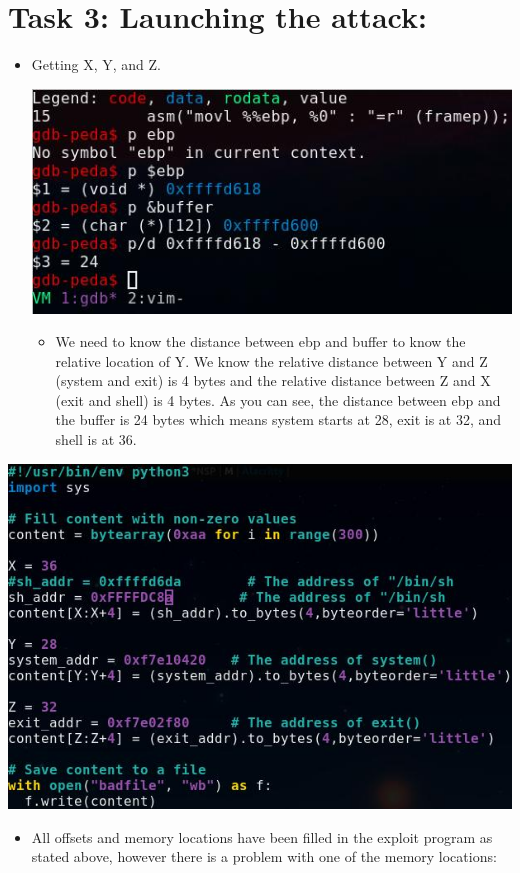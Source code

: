 \documentclass[11pt]{article}
\begin{document}
\section*{Task 3: Launching the attack:}
\label{sec:org2742746}
\begin{itemize}
\item Getting X, Y, and Z.
\begin{center}
\includegraphics[width=.9\linewidth]{./images/3.jpg}
\end{center}
\begin{itemize}
\item We need to know the distance between ebp and buffer to know the relative location of Y. We know the relative distance between Y and Z (system and exit) is 4 bytes and the relative distance between Z and X (exit and shell) is 4 bytes. As you can see, the distance between ebp and the buffer is 24 bytes which means system starts at 28, exit is at 32, and shell is at 36.
\end{itemize}
\end{itemize}
\begin{center}
\includegraphics[width=.9\linewidth]{./images/2.jpg}
\end{center}
\begin{itemize}
\item All offsets and memory locations have been filled in the exploit program as stated above, however there is a problem with one of the memory locations:
\end{itemize}
\end{document}

